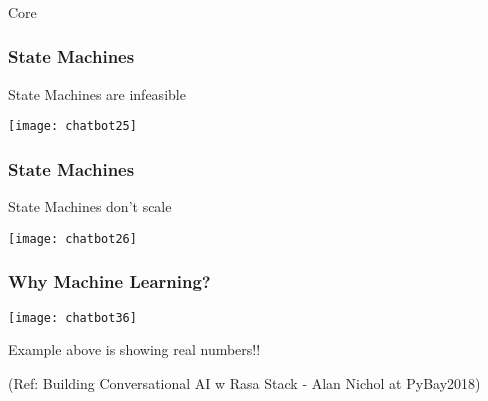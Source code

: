 \begin{frame}[fragile]\frametitle{}
\begin{center}
{\Large Core}

\end{center}
\end{frame}


 \begin{frame}[fragile]\frametitle{State Machines}
State Machines are infeasible

\begin{center}
\texttt{[image: chatbot25]}

\end{center}

\end{frame}


 \begin{frame}[fragile]\frametitle{State Machines}
State Machines don't scale

\begin{center}
\texttt{[image: chatbot26]}

\end{center}

\end{frame}


 \begin{frame}[fragile]\frametitle{Why Machine Learning?}
\begin{center}
\texttt{[image: chatbot36]}

\end{center}

Example above is showing real numbers!!


{\tiny (Ref: Building Conversational AI w Rasa Stack - Alan Nichol at PyBay2018)}

\end{frame}


